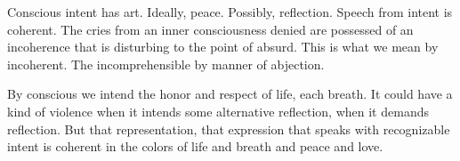 

﻿Conscious intent has art.  Ideally, peace.  Possibly, reflection.
Speech from intent is coherent.  The cries from an inner consciousness
denied are possessed of an incoherence that is disturbing to the point
of absurd.  This is what we mean by incoherent.  The incomprehensible
by manner of abjection.

By conscious we intend the honor and respect of life, each breath.  It
could have a kind of violence when it intends some alternative
reflection, when it demands reflection.  But that representation, that
expression that speaks with recognizable intent is coherent in the
colors of life and breath and peace and love.

\bye
